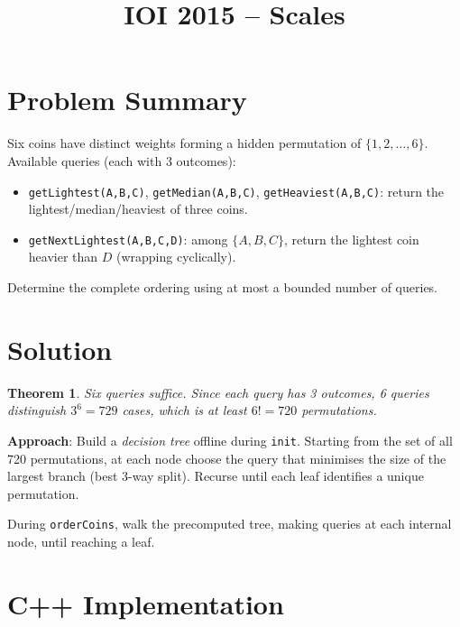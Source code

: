 \documentclass[11pt,a4paper]{article}
\title{IOI 2015 -- Scales}
\author{}
\date{}
\newtheorem{theorem}{Theorem}
\begin{document}
\maketitle

\section{Problem Summary}

Six coins have distinct weights forming a hidden permutation of $\{1, 2, \ldots, 6\}$. Available queries (each with 3 outcomes):
\begin{itemize}
  \item \texttt{getLightest(A,B,C)}, \texttt{getMedian(A,B,C)}, \texttt{getHeaviest(A,B,C)}: return the lightest/median/heaviest of three coins.
  \item \texttt{getNextLightest(A,B,C,D)}: among $\{A,B,C\}$, return the lightest coin heavier than $D$ (wrapping cyclically).
\end{itemize}
Determine the complete ordering using at most a bounded number of queries.

\section{Solution}

\begin{theorem}
Six queries suffice. Since each query has 3 outcomes, 6 queries distinguish $3^6 = 729$ cases, which is at least $6! = 720$ permutations.
\end{theorem}

\textbf{Approach}: Build a \emph{decision tree} offline during \texttt{init}. Starting from the set of all 720 permutations, at each node choose the query that minimises the size of the largest branch (best 3-way split). Recurse until each leaf identifies a unique permutation.

During \texttt{orderCoins}, walk the precomputed tree, making queries at each internal node, until reaching a leaf.

\section{C++ Implementation}
\end{document}
